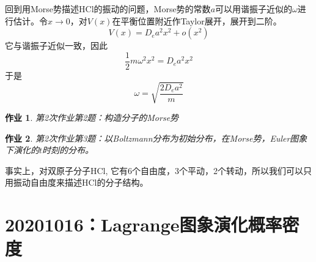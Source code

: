 \documentclass[12pt]{article}
\newtheorem{asg}{作业}
\begin{document}
回到用Morse势描述HCl的振动的问题，Morse势的常数$a$可以用谐振子近似的$\omega$进行估计。令$x \to 0 $，对$V(x)$在平衡位置附近作Taylor展开，展开到二阶。
\begin{equation*}
    V(x) = D_e a^2 x^2 + o(x^2)
\end{equation*}
它与谐振子近似一致，因此
\begin{equation*}
    \frac 12 m\omega^2x^2 = D_e a^2 x^2
\end{equation*}
于是
\begin{equation*}
    \omega = \sqrt{\frac {2D_ea^2}m}
\end{equation*}
\begin{asg}
    第2次作业第2题：构造分子的Morse势
\end{asg}
\begin{asg}
    第2次作业第3题：以Boltzmann分布为初始分布，在Morse势，Euler图象下演化的$t$时刻的分布。
\end{asg}
事实上，对双原子分子HCl, 它有6个自由度，3个平动，2个转动，所以我们可以只用振动自由度来描述HCl的分子结构。

\section{20201016：Lagrange图象演化概率密度}
\end{document}
